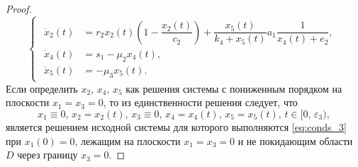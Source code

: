 \documentclass[14pt,a4paper]{extarticle}
\begin{document}
\begin{proof}
		\begin{equation*}
			\begin{cases}
				\begin{aligned}
					\dot{x}_2(t) &= r_2x_2(t)\left(1-\dfrac{x_2(t)}{c_2}\right)+\dfrac{x_5(t)}{k_4+x_5(t)}a_1\dfrac{1}{x_4(t)+e_2},\\
					\dot{x}_4(t) &= s_1-\mu_2x_4(t),\\
					\dot{x}_5(t) &= -\mu_3x_5(t).
				\end{aligned}
			\end{cases}
		\end{equation*}
		Если определить $x_2,\, x_4,\, x_5$ как решения системы с пониженным порядком на плоскости $x_1=x_3=0$, то из единственности решения следует, что
		\[x_1\equiv0,\, x_2=x_2(t),\, x_3\equiv0,\, x_4=x_4(t),\, x_5=x_5(t),\, t\in[0,\,\varepsilon_3),\]
		является решением исходной системы для которого выполняются \ref{eq:conds_3} при $x_1(0)=0$, лежащим на плоскости $x_1=x_3=0$ и не покидающим области $D$ через границу $x_3=0$.
		
		

\end{proof}
\end{document}
